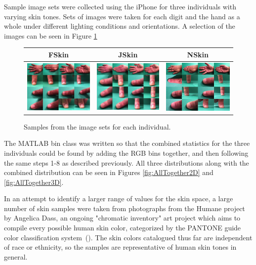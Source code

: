 Sample image sets were collected using the iPhone for three individuals with varying skin tones. Sets of images were taken for each digit and the hand as a whole under different lighting conditions and orientations. A selection of the images can be seen in Figure \ref{fig:SetSamples}


\begin{figure}[h!]
  \centering
  \begin{tabular}{||c||c||c||}
  \hline \rule[-2ex]{0pt}{5.5ex}  FSkin &  JSkin & NSkin \\ 
  \hline \rule[-2ex]{0pt}{5.5ex} 
  \includegraphics[width=0.3 \textwidth]{Chapter3/Figs/SampleCollages/FSkin_Sample.jpg} & 
  \includegraphics[width=0.3 \textwidth]{Chapter3/Figs/SampleCollages/JSkin_Sample.jpg} &  
  \includegraphics[width=0.3 \textwidth]{Chapter3/Figs/SampleCollages/NSkin_Sample.jpg}\\ 
  \hline 
  \end{tabular} 
    \caption{Samples from the image sets for each individual.}  \label{fig:SetSamples}
\end{figure}

The MATLAB bin class was written so that the combined statistics for the three individuals could be found by adding the RGB bins together, and then following the same steps 1-8 as described previously. All three distributions along with the combined distribution can be seen in Figures \ref{fig:AllTogether2D} and \ref{fig:AllTogether3D}.


In an attempt to identify a larger range of values for the skin space, a large number of skin samples were taken from photographs from the Humane project by Angelica Dass, an ongoing "chromatic inventory" art project which aims to compile every possible human skin color, categorized by the PANTONE guide color classification system~(\cite{Dass2012}). The skin colors catalogued thus far are independent of race or ethnicity, so the samples are representative of human skin tones in general.

